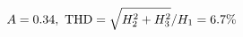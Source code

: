 \documentclass[preview]{standalone}
\begin{document}
\begin{align*}
\special{dvisvgm:raw <g id='unique000'>}A=0.34,\ \text{THD}=\sqrt{H_2^2+H_3^2}/H_1=6.7\%\special{dvisvgm:raw </g>}
\end{align*}
\end{document}
